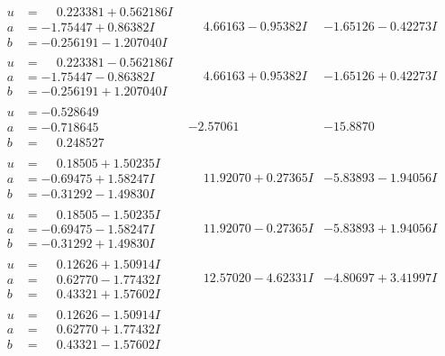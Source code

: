 \documentclass[1p]{elsarticle_modified}
\theoremstyle{definition}
\begin{document}
$$\begin{array}{c|c|c}
\begin{aligned}
u &= \phantom{-}0.223381 + 0.562186 I \\
a &= -1.75447 + 0.86382 I \\
b &= -0.256191 - 1.207040 I\end{aligned}
 & \phantom{-}4.66163 - 0.95382 I & -1.65126 - 0.42273 I \\ \hline\begin{aligned}
u &= \phantom{-}0.223381 - 0.562186 I \\
a &= -1.75447 - 0.86382 I \\
b &= -0.256191 + 1.207040 I\end{aligned}
 & \phantom{-}4.66163 + 0.95382 I & -1.65126 + 0.42273 I \\ \hline\begin{aligned}
u &= -0.528649\phantom{ +0.000000I} \\
a &= -0.718645\phantom{ +0.000000I} \\
b &= \phantom{-}0.248527\phantom{ +0.000000I}\end{aligned}
 & -2.57061\phantom{ +0.000000I} & -15.8870\phantom{ +0.000000I} \\ \hline\begin{aligned}
u &= \phantom{-}0.18505 + 1.50235 I \\
a &= -0.69475 + 1.58247 I \\
b &= -0.31292 - 1.49830 I\end{aligned}
 & \phantom{-}11.92070 + 0.27365 I & -5.83893 - 1.94056 I \\ \hline\begin{aligned}
u &= \phantom{-}0.18505 - 1.50235 I \\
a &= -0.69475 - 1.58247 I \\
b &= -0.31292 + 1.49830 I\end{aligned}
 & \phantom{-}11.92070 - 0.27365 I & -5.83893 + 1.94056 I \\ \hline\begin{aligned}
u &= \phantom{-}0.12626 + 1.50914 I \\
a &= \phantom{-}0.62770 - 1.77432 I \\
b &= \phantom{-}0.43321 + 1.57602 I\end{aligned}
 & \phantom{-}12.57020 - 4.62331 I & -4.80697 + 3.41997 I \\ \hline\begin{aligned}
u &= \phantom{-}0.12626 - 1.50914 I \\
a &= \phantom{-}0.62770 + 1.77432 I \\
b &= \phantom{-}0.43321 - 1.57602 I\end{aligned}

\end{array}$$
\end{document}
